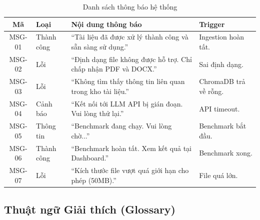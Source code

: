 \begin{table}[H]
  \centering
  \caption{Danh sách thông báo hệ thống}
  \label{tab:messages}
  \renewcommand{\arraystretch}{1.4}
  \begin{tabularx}{\textwidth}{|c|l|X|l|}
    \hline
    \rowcolor{blue!10}
    \textbf{Mã} & \textbf{Loại} & \textbf{Nội dung thông báo} & \textbf{Trigger} \\
    \hline
    MSG-01 & Thành công & ``Tài liệu đã được xử lý thành công và sẵn sàng sử dụng.'' & Ingestion hoàn tất. \\
    \hline
    MSG-02 & Lỗi & ``Định dạng file không được hỗ trợ. Chỉ chấp nhận PDF và DOCX.'' & Sai định dạng. \\
    \hline
    MSG-03 & Lỗi & ``Không tìm thấy thông tin liên quan trong kho tài liệu.'' & ChromaDB trả về rỗng. \\
    \hline
    MSG-04 & Cảnh báo & ``Kết nối tới LLM API bị gián đoạn. Vui lòng thử lại.'' & API timeout. \\
    \hline
    MSG-05 & Thông tin & ``Benchmark đang chạy. Vui lòng chờ...'' & Benchmark bắt đầu. \\
    \hline
    MSG-06 & Thành công & ``Benchmark hoàn tất. Xem kết quả tại Dashboard.'' & Benchmark xong. \\
    \hline
    MSG-07 & Lỗi & ``Kích thước file vượt quá giới hạn cho phép (50MB).'' & File quá lớn. \\
    \hline
  \end{tabularx}
\end{table}

\subsection{Thuật ngữ Giải thích (Glossary)}

